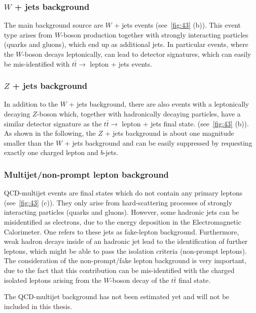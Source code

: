  \subsubsection{$W$ + jets background}
The main background source  are $W$ + jets events (see~\cref{fig:43} (b)). This event type arises from $W$-boson production together with strongly interacting particles (quarks and gluons), which end up as additional jets. In particular events, where the $W$-boson decays leptonically, can lead to detector signatures, which can easily be mis-identified with $t\bar{t} \rightarrow$ lepton + jets events.



 \subsubsection{$Z$ + jets background} 
In addition to the $W$ + jets background, there are also events with a leptonically decaying $Z$-boson which, together with hadronically decaying particles, have a similar detector signature as the  $t\bar{t} \rightarrow$ lepton + jets final state. (see~\cref{fig:43} (b)). As shown in the following, the $Z$ + jets background is about one magnitude smaller than the $W$ + jets background and can be easily suppressed by requesting exactly one charged lepton and $b$-jets.



\subsubsection{Multijet/non-prompt lepton background}
QCD-multijet events are final states which do not contain any primary leptons (see~\cref{fig:43} (c)). They only arise from hard-scattering processes of strongly interacting particles (quarks and gluons). However, some hadronic jets can be misidentified as electrons, due to the energy deposition in the Electromagnetic Calorimeter. One refers to these jets as fake-lepton background. Furthermore, weak hadron decays inside of an hadronic jet lead to the identification of further leptons, which might be able to pass the isolation criteria (non-prompt leptons).
The consideration of the non-prompt/fake lepton background is very important, due to the fact that this contribution can be mis-identified with the charged isolated leptons arising from the $W$-boson decay of the $t\bar{t}$ final state.

The QCD-multijet  background has not been estimated yet and will not be included in this thesis.
 
